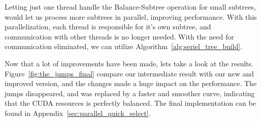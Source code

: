 Letting just one thread handle the Balance-Subtree operation for small subtrees, would let us process more subtrees in parallel, improving performance. With this parallelization, each thread is responsible for it's own subtree, and communication with other threads is no longer needed. With the need for communication eliminated, we can utilize Algorithm~\ref{alg:seriel_tree_build}. 


Now that a lot of improvements have been made, lets take a look at the results. Figure~\ref{fig:the_jumps_final} compare our intermediate result with our new and improved version, and the changes made a huge impact on the performance. The jumps disappeared, and was replaced by a faster and smoother curve, indicating that the CUDA resources is perfectly balanced. The final implementation can be found in Appendix~\ref{sec:parallel_quick_select}.
